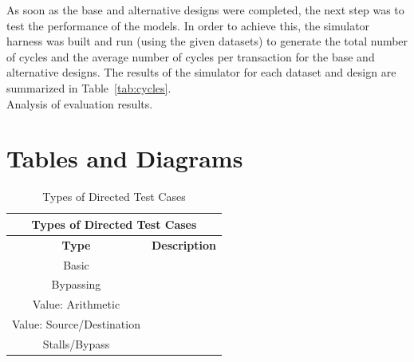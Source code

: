 \documentclass[10pt]{article}
\begin{document}
As soon as the base and alternative designs were completed, the next step was to test the performance of the models. In order to achieve this, the simulator harness was built and run (using the given datasets) to generate the total number of cycles and the average number of cycles per transaction for the base and alternative designs. The results of the simulator for each dataset and design are summarized in Table~\ref{tab:cycles}. \\

Analysis of evaluation results. \\


\pagebreak[4]

\section {Tables and Diagrams}


\begin{center}
\begin{table}[h]
\begin{tabular}{| c | c |}
\hline
\multicolumn{2}{|c|}{Types of Directed Test Cases}   \\
\hline
\textbf{Type}                         &    \textbf{Description}  	\\   \hline      
Basic            					  &           					\\
Bypassing                             &								\\
Value: Arithmetic           		  &          					\\        
Value: Source/Destination             & 							\\
Stalls/Bypass 						  & 							\\
\hline                                                 
\end{tabular}
\caption{Types of Directed Test Cases} 
\label{table:tests}
\end{table}
\end{center}

\end{document}
